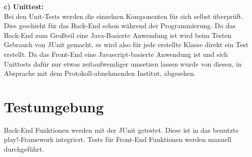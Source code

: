  \textbf{c) Unittest:} \\
 Bei den Unit-Tests werden die einzelnen Komponenten für sich selbst überprüft. 
 Dies geschieht für das Back-End schon während der Programmierung. Da das Back-End zum Großteil eine Java-Basierte Anwendung ist wird beim Testen Gebrauch von JUnit gemacht, es wird also für jede erstellte Klasse direkt ein Test erstellt.
 Da das Front-End eine Javascript-basierte Anwendung ist und sich Unittests dafür nur etwas zeitaufwendiger umsetzen lassen wurde von diesen, in Absprache mit dem Protokoll-abnehmenden Institut, abgesehen.

\section{Testumgebung}
 Back-End Funktionen werden mit der JUnit getestet. Diese ist in das benutzte play!-Framework integriert.
Tests für Front-End Funktionen werden manuell durchgeführt.
 







%
%




